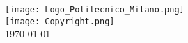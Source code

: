 \documentclass[12pt]{article}
\begin{document}
\begin{titlepage}

\texttt{[image: Logo\_Politecnico\_Milano.png]}\\[2cm] %


\texttt{[image: Copyright.png]}\\[1cm]


{\large \today}\\[2cm] %
 

\newpage

\end{titlepage}

\tableofcontents

\newpage










\end{document}
